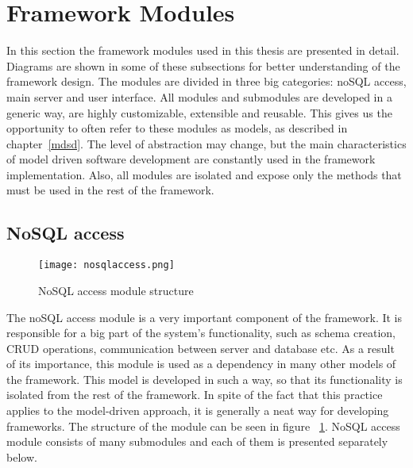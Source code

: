 \section{Framework Modules}
In this section the framework modules used in this thesis are presented in detail. Diagrams are shown in some of these subsections for better understanding of the framework design. The modules are divided in three big categories: noSQL access, main server and user interface. All modules and submodules are developed in a generic way, are highly customizable, extensible and reusable. This gives us the opportunity to often refer to these modules as models, as described in chapter~\ref{mdsd}. The level of abstraction may change, but the main characteristics of model driven software development are constantly used in the framework implementation. Also, all modules are isolated and expose only the methods that must be used in the rest of the framework.


\subsection{NoSQL access}
\label{nosql}
\begin{figure}
	\centerline{\texttt{[image: nosqlaccess.png]}}
	\caption{NoSQL access module structure}
	\label{nosqlaccess}
\end{figure}
The noSQL access module is a very important component of the framework. It is responsible for a big part of the system's functionality, such as schema creation, CRUD operations, communication between server and database etc. As a result of its importance, this module is used as a dependency in many other models of the framework. This model is developed in such a way, so that its functionality is isolated from the rest of the framework. In spite of the fact that this practice applies to the model-driven approach, it is generally a neat way for developing frameworks. The structure of the module can be seen in figure ~\ref{nosqlaccess}. NoSQL access module consists of many submodules and each of them is presented separately below. 

